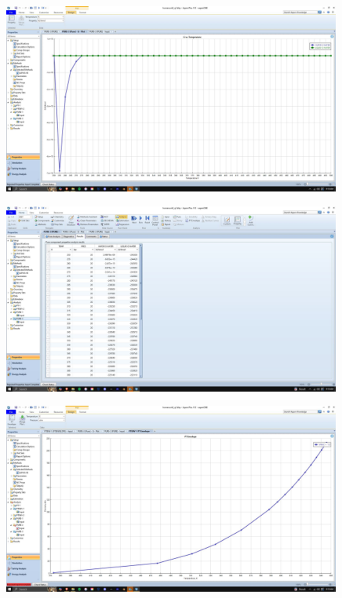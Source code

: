 \documentclass{article}
\begin{document}
\begin{figure}[H]
    \centering
    \includegraphics[width=0.99\textwidth, frame]{img/10 (g graph20bar).JPG}
\end{figure}

\begin{figure}[H]
    \centering
    \includegraphics[width=0.99\textwidth, frame]{img/11 (gtable20bar).JPG}
\end{figure}

\begin{figure}[H]
    \centering
    \includegraphics[width=0.99\textwidth, frame]{img/12 (ptenvelope).JPG}
\end{figure}
\end{document}

